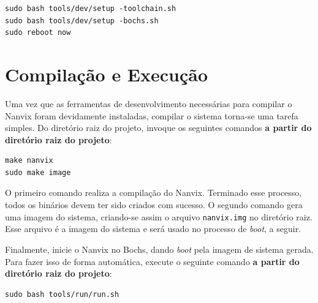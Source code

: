 \documentclass[11pt]{article}
\begin{document}
\begin{verbatim}
sudo bash tools/dev/setup -toolchain.sh
sudo bash tools/dev/setup -bochs.sh
sudo reboot now
\end{verbatim}

\section{Compilação e Execução}
\label{sec:compilacao}

Uma vez que as ferramentas de desenvolvimento necessárias para compilar o Nanvix foram devidamente instaladas, compilar o sistema torna-se uma tarefa simples. Do diretório raiz do projeto, invoque os seguintes comandos \textbf{a partir do diretório raiz do projeto}:

\begin{verbatim}
make nanvix
sudo make image
\end{verbatim}

O primeiro comando realiza a compilação do Nanvix. Terminado esse processo, todos os binários devem ter sido criados com sucesso. O segundo comando gera uma imagem do sistema, criando-se assim o arquivo \texttt{nanvix.img} no diretório raiz. Esse arquivo é a imagem do sistema e será usado no processo de \textit{boot}, a seguir.

Finalmente, inicie o Nanvix no Bochs, dando \textit{boot} pela imagem de sistema gerada. Para fazer isso de forma automática, execute o seguinte comando \textbf{a partir do diretório raiz do projeto}:

\begin{verbatim}
sudo bash tools/run/run.sh
\end{verbatim}
\end{document}
